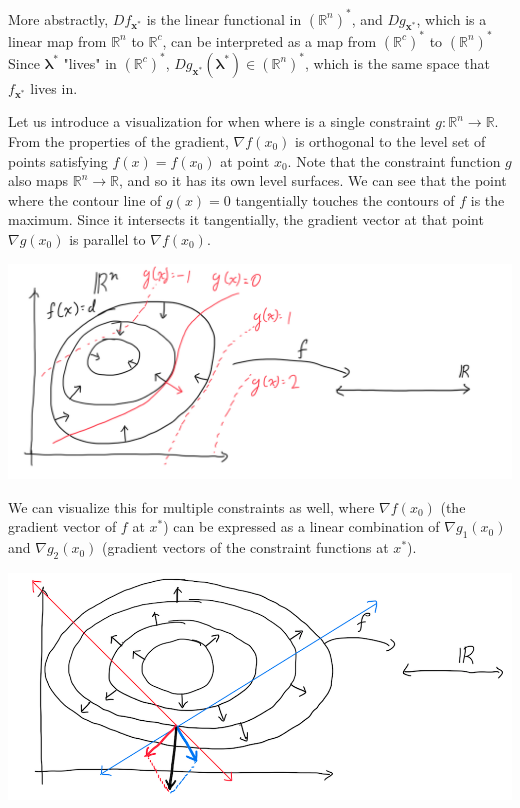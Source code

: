 \documentclass{article}
\theoremstyle{remark}
\theoremstyle{definition}
\begin{document}
More abstractly, $D f_{\mathbf{x}^*}$ is the linear functional in $(\mathbb{R}^n)^*$, and $D g_{\mathbf{x}^*}$, which is a linear map from $\mathbb{R}^n$ to $\mathbb{R}^c$, can be interpreted as a map from $(\mathbb{R}^c)^*$ to $(\mathbb{R}^n)^*$ Since $\boldsymbol{\lambda}^*$ "lives" in $(\mathbb{R}^c)^*$, $D g_{\mathbf{x}^*}(\boldsymbol{\lambda}^*) \in (\mathbb{R}^n)^*$, which is the same space that $f_{\mathbf{x}^*}$ lives in. 


Let us introduce a visualization for when where is a single constraint $g: \mathbb{R}^n \longrightarrow \mathbb{R}$. From the properties of the gradient, $\nabla f(x_0)$ is orthogonal to the level set of points satisfying $f(x) = f(x_0)$ at point $x_0$. Note that the constraint function $g$ also maps $\mathbb{R}^n \longrightarrow \mathbb{R}$, and so it has its own level surfaces. We can see that the point where the contour line of $g(x) = 0$ tangentially touches the contours of $f$ is the maximum. Since it intersects it tangentially, the gradient vector at that point $\nabla g(x_0)$ is parallel to $\nabla f(x_0)$. 
\begin{center}
    \includegraphics[scale=0.22]{img/Lagrange_Multiplier_Single_Constraint.PNG}
\end{center}
We can visualize this for multiple constraints as well, where $\nabla f(x_0)$ (the gradient vector of $f$ at $x^*$) can be expressed as a linear combination of $\nabla g_1 (x_0)$ and $\nabla g_2 (x_0)$ (gradient vectors of the constraint functions at $x^*$). 
\begin{center}
    \includegraphics[scale=0.27]{img/Lagrange_Multiplier_Multiple_Constraints.PNG}
\end{center}
\end{document}

